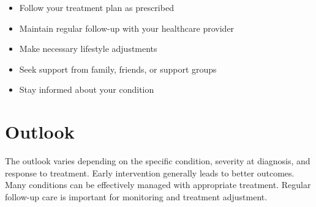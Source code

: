 \begin{itemize}[noitemsep]
  \item Follow your treatment plan as prescribed
  \item Maintain regular follow-up with your healthcare provider
  \item Make necessary lifestyle adjustments
  \item Seek support from family, friends, or support groups
  \item Stay informed about your condition
\end{itemize}
\section{Outlook}
The outlook varies depending on the specific condition, severity at diagnosis, and response to treatment. Early intervention generally leads to better outcomes. Many conditions can be effectively managed with appropriate treatment. Regular follow-up care is important for monitoring and treatment adjustment.
